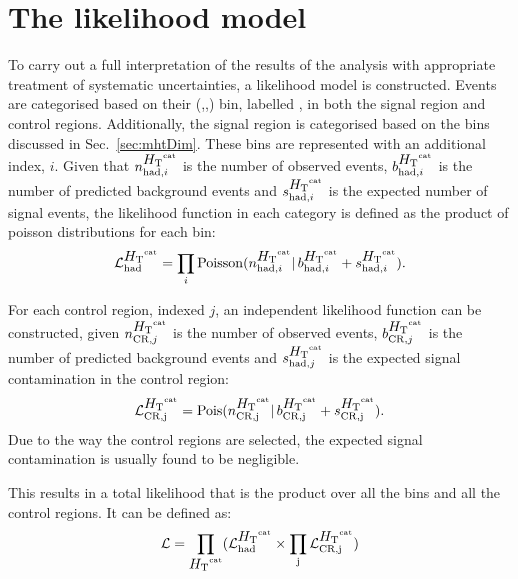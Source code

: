 \section{The likelihood model}  %
\label{sec:likelihood}

To carry out a full interpretation of the results of the analysis with
appropriate treatment of systematic uncertainties, a likelihood model
is constructed. Events are categorised based on their (\HT,\nj,\nb)
bin, labelled \htcat, in both the signal region and control regions. Additionally, the
signal region is categorised based on the \MHT bins discussed in
Sec.~\ref{sec:mhtDim}. These bins are represented with an additional
index, $i$. Given
that $n^{\mbox{$H_\text{T}$}^{\text{cat}}}_{\mathrm{had},i}$ is the number of observed events,
$b^{\mbox{$H_\text{T}$}^{\text{cat}}}_{\mathrm{had},i}$ is the number of predicted background
events and $s^{\mbox{$H_\text{T}$}^{\text{cat}}}_{\mathrm{had},i}$ is the expected number of
signal events, the likelihood function in each \htcat category is
defined as the product of poisson distributions for each \MHT bin:
\begin{equation}
\mathcal{L}^{\mbox{$H_\text{T}$}^{\text{cat}}}_{\mathrm{had}}=\prod_i
\mathrm{Poisson}(n^{\mbox{$H_\text{T}$}^{\text{cat}}}_{\mathrm{had},i} |\,
b^{\mbox{$H_\text{T}$}^{\text{cat}}}_{\mathrm{had},i} + s^{\mbox{$H_\text{T}$}^{\text{cat}}}_{\mathrm{had},i}).
\label{eq:hadronicLikelihood}
\end{equation}

For each control region, indexed $j$, an independent likelihood
function can be constructed, given $n^{\mbox{$H_\text{T}$}^{\text{cat}}}_{\mathrm{CR},j}$ is
the number of observed events, $b^{\mbox{$H_\text{T}$}^{\text{cat}}}_{\mathrm{CR},j}$ is the
number of predicted background events and
$s^{\mbox{$H_\text{T}$}^{\text{cat}}}_{\mathrm{had},j}$ is the expected signal contamination in
the control region:
\begin{equation}
\mathcal{L}^{\mbox{$H_\text{T}$}^{\text{cat}}}_{\mathrm{CR,j}}=\mathrm{Pois}(n^{\mbox{$H_\text{T}$}^{\text{cat}}}_{\mathrm{CR,j}}
|\, b^{\mbox{$H_\text{T}$}^{\text{cat}}}_{\mathrm{CR,j}} + s^{\mbox{$H_\text{T}$}^{\text{cat}}}_{\mathrm{CR,j}}).
\label{eq:controlLikelihood}
\end{equation}
Due to the way the control regions are selected, the expected signal
contamination is usually found to be negligible.

This results in a total likelihood that is the product over all the
\htcat bins and all the control regions. It can be defined as:
\begin{equation}
\label{eq:total_likelihood}
\mathcal{L} = \prod_{\mbox{$H_\text{T}$}^{\text{cat}}} (\mathcal{L}_{\text{had}}^{\mbox{$H_\text{T}$}^{\text{cat}}} \times
\prod_{\text{j}} \mathcal{L}_{\text{CR,j}}^{\mbox{$H_\text{T}$}^{\text{cat}}})
\end{equation}

